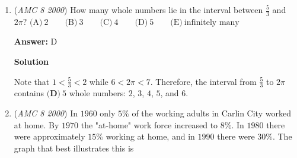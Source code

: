 \begin{enumerate}
 Therefore, $x < \frac{1}{x}$ if and only if either $x < -1$ or $0 < x < 1$.  Of the answer choices, only $\boxed {\textbf{(A)}\ {-2}}$ is a possible value of $x$.

 



\textbf{Solution 3}

Starting again with $x < \frac{1}{x}$, we avoid multiplication by $x$.   Instead, move everything to the left, and find a common denominator:

 $x < \frac{1}{x}$
$x - \frac{1}{x} < 0$
$\frac{x^2 - 1}{x} < 0$
$\frac{(x+1)(x-1)}{x} < 0$

 Divide this expression at $x=-1$, $x=0$, and $x=1$, as those are the three points where the expression on the left will "change sign".

 If $x<-1$, all three of those terms will be negative, and the inequality is true.  Therefore, $(-\infty, -1)$ is part of our solution set.

 If $-1 < x < 0$, the $(x+1)$ term will become positive, but the other two terms remain negative.  Thus, there are no solutions in this region.

 If $0 < x < 1$, then both $(x+1)$ and $x$ are positive, while $(x-1)$ remains negative.  Thus, the entire region $(0, 1)$ is part of the solution set.

 If $1 < x$, then all three terms are positive, and there are no solutions.

 At all three "boundary points", the function is either $0$ or undefined.  Therefore, the entire solution set is $(-\infty, -1) \cup (0, 1)$, and the only option in that region is $x=-2$, leading to $\boxed{A}$.

 


	\item (\textit{AMC 8 2000}) How many whole numbers lie in the interval between $\frac{5}{3}$ and $2\pi?$
$\text{(A)}\ 2 \qquad \text{(B)}\ 3 \qquad \text{(C)}\ 4 \qquad \text{(D)}\ 5 \qquad \text{(E)}\ \text{infinitely many}$

 \textbf{Answer: }D



\textbf{Solution}

Note that $1 < \frac{5}{3} < 2$ while $6 < 2\pi < 7$.  Therefore, the interval from $\frac{5}{3}$ to $2\pi$ contains $\boxed{\textbf{(D)}\ 5}$ whole numbers: $2$, $3$, $4$, $5$, and $6$.

 


	\item (\textit{AMC 8 2000}) In $1960$ only $5\%$ of the working adults in Carlin City worked at home. By $1970$ the "at-home" work force increased to $8\%$. In $1980$ there were approximately $15\%$ working at home, and in $1990$ there were $30\%$. The graph that best illustrates this is



\end{enumerate}

